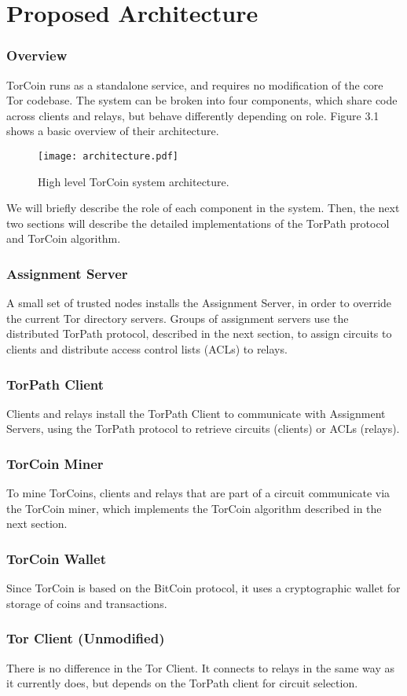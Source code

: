 \section{Proposed Architecture} \label{arch}

\subsubsection{Overview}

TorCoin runs as a standalone service, and requires no modification of the core Tor codebase. The system can be broken into four components, which share code across clients and relays, but behave differently depending on role. Figure 3.1 shows a basic overview of their architecture.

\begin{figure}
  \centering
    \texttt{[image: architecture.pdf]}
  \caption{High level TorCoin system architecture.}
\end{figure}

We will briefly describe the role of each component in the system. Then, the next two sections will describe the detailed implementations of the TorPath protocol and TorCoin algorithm.

\subsubsection{Assignment Server}
A small set of trusted nodes installs the Assignment Server, in order to override the current Tor directory servers. Groups of assignment servers use the distributed TorPath protocol, described in the next section, to assign circuits to clients and distribute access control lists (ACLs) to relays.

\subsubsection{TorPath Client}
Clients and relays install the TorPath Client to communicate with Assignment Servers, using the TorPath protocol to retrieve circuits (clients) or ACLs (relays).

\subsubsection{TorCoin Miner}
To mine TorCoins, clients and relays that are part of a circuit communicate via the TorCoin miner, which implements the TorCoin algorithm described in the next section.

\subsubsection{TorCoin Wallet}
Since TorCoin is based on the BitCoin protocol, it uses a cryptographic wallet for storage of coins and transactions.

\subsubsection{Tor Client (Unmodified)}
There is no difference in the Tor Client. It connects to relays in the same way as it currently does, but depends on the TorPath client for circuit selection.
